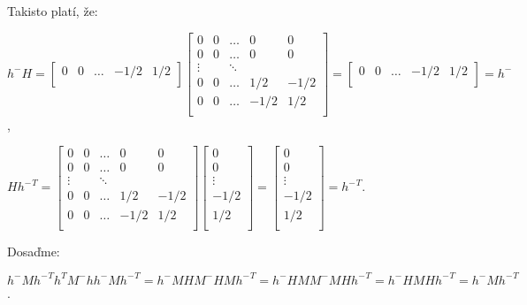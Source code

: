 \begin{dokaz}
Takisto platí, že:

\begin{center}
$
h^- H =
\begin{bmatrix}
0 & 0 & \ldots & -1/2 & 1/2 \\
\end{bmatrix}
\begin{bmatrix}
0 & 0 & \ldots & 0 & 0 \\
0 & 0 & \ldots & 0 & 0 \\
\vdots && \ddots \\
0 & 0 & \ldots & 1/2 & -1/2 \\
0 & 0 & \ldots & -1/2 & 1/2 \\
\end{bmatrix}
=
\begin{bmatrix}
0 & 0 & \ldots & -1/2 & 1/2 \\
\end{bmatrix}
= h^-
$,
\end{center}

\begin{center}
$
H {h^-}^T =
\begin{bmatrix}
0 & 0 & \ldots & 0 & 0 \\
0 & 0 & \ldots & 0 & 0 \\
\vdots && \ddots \\
0 & 0 & \ldots & 1/2 & -1/2 \\
0 & 0 & \ldots & -1/2 & 1/2 \\
\end{bmatrix}
\begin{bmatrix}
0 \\
0 \\
\vdots \\
-1/2 \\
1/2 \\
\end{bmatrix}
=
\begin{bmatrix}
0 \\
0 \\
\vdots \\
-1/2 \\
1/2 \\
\end{bmatrix}
= {h^-}^T
$.
\end{center}

Dosaďme:

\begin{center}
$
h^- M {h^-}^T h^T M^- h h^- M {h^-}^T = h^- M H M^- H M {h^-}^T = h^- H M M^- M H {h^-}^T = h^- H M H {h^-}^T = h^- M {h^-}^T
$.
\end{center}


\end{dokaz}
